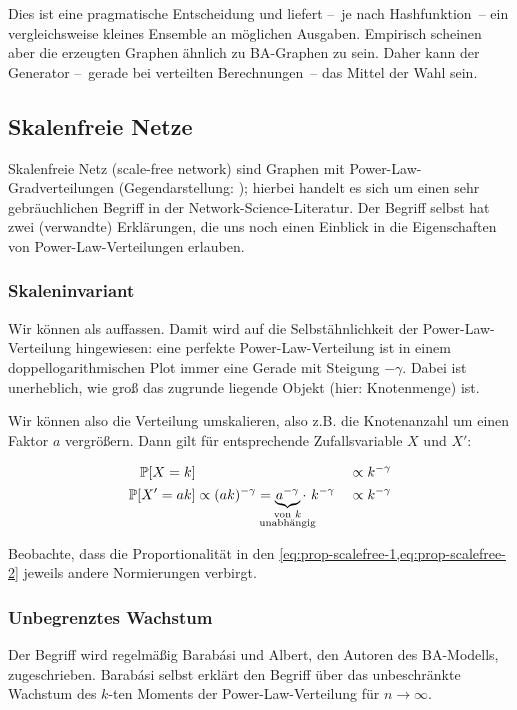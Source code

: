 Dies ist eine pragmatische Entscheidung und liefert --~je nach Hashfunktion~-- ein vergleichsweise kleines Ensemble an möglichen Ausgaben.
Empirisch scheinen aber die erzeugten Graphen ähnlich zu BA-Graphen zu sein.
Daher kann der Generator --~gerade bei verteilten Berechnungen~-- das Mittel der Wahl sein.

\subsection{Skalenfreie Netze}
Skalenfreie Netz (scale-free network) sind Graphen mit Power-Law-Gradverteilungen (Gegendarstellung: \cite{doi:10.1073/pnas.200327197});
hierbei handelt es sich um einen sehr gebräuchlichen Begriff in der Network-Science-Literatur.
Der Begriff selbst hat zwei (verwandte) Erklärungen, die uns noch einen Einblick in die Eigenschaften von Power-Law-Verteilungen erlauben.

\subsubsection{Skaleninvariant}\label{subsec:scaleinvariant}
Wir können  als  auffassen.
Damit wird auf die Selbstähnlichkeit der Power-Law-Verteilung hingewiesen:
eine perfekte Power-Law-Verteilung ist in einem doppellogarithmischen Plot immer eine Gerade mit Steigung $-\gamma$.
Dabei ist unerheblich, wie groß das zugrunde liegende Objekt (hier: Knotenmenge) ist.

Wir können also die Verteilung umskalieren, also z.B. die Knotenanzahl um einen Faktor $a$ vergrößern.
Dann gilt für entsprechende Zufallsvariable $X$ und $X'$:

\begin{alignat}{2}
    \prob{X = k}   &                                                                                                                       && \propto k^{-\gamma}  \label{eq:prop-scalefree-1} \\
    \prob{X' = ak} & \propto (ak)^{-\gamma} = \underbrace{a^{-\gamma}}_{\mathclap{\substack{\text{von $k$} \\ \text{unabhängig}}}} \cdot\ k^{-\gamma} && \propto k^{-\gamma}\label{eq:prop-scalefree-2}
\end{alignat}

Beobachte, dass die Proportionalität in den \cref{eq:prop-scalefree-1,eq:prop-scalefree-2} jeweils andere Normierungen verbirgt.

\subsubsection{Unbegrenztes Wachstum}
Der Begriff  wird regelmäßig Barab{\'{a}}si und Albert, den Autoren des BA-Modells, zugeschrieben.
Barab{\'{a}}si selbst erklärt den Begriff über das unbeschränkte Wachstum des $k$-ten Moments der Power-Law-Verteilung für $n \to \infty$.

